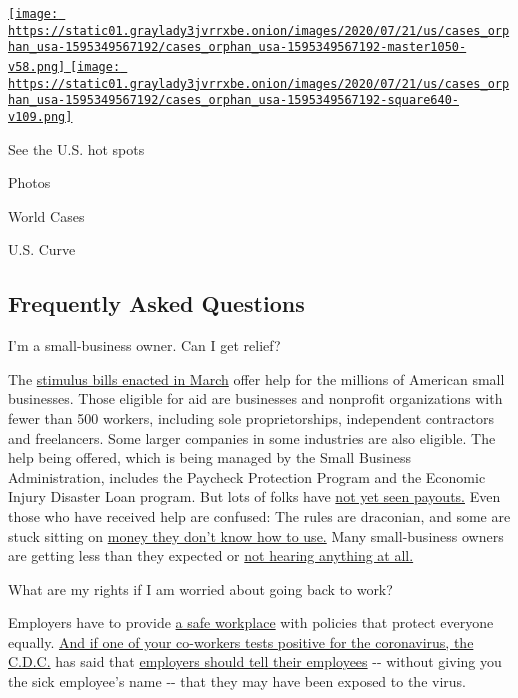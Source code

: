 \href{https://www.nytimes3xbfgragh.onion/interactive/2020/us/coronavirus-us-cases.html}{\texttt{[image: https://static01.graylady3jvrrxbe.onion/images/2020/07/21/us/cases\_orphan\_usa-1595349567192/cases\_orphan\_usa-1595349567192-master1050-v58.png]}
\texttt{[image: https://static01.graylady3jvrrxbe.onion/images/2020/07/21/us/cases\_orphan\_usa-1595349567192/cases\_orphan\_usa-1595349567192-square640-v109.png]}}

See the U.S. hot spots

Photos

World Cases

U.S. Curve

\hypertarget{frequently-asked-questions}{%
\subsection{Frequently Asked
Questions}\label{frequently-asked-questions}}

I'm a small-business owner. Can I get relief?

The
\href{https://www.nytimes3xbfgragh.onion/article/small-business-loans-stimulus-grants-freelancers-coronavirus.html}{stimulus
bills enacted in March} offer help for the millions of American small
businesses. Those eligible for aid are businesses and nonprofit
organizations with fewer than 500 workers, including sole
proprietorships, independent contractors and freelancers. Some larger
companies in some industries are also eligible. The help being offered,
which is being managed by the Small Business Administration, includes
the Paycheck Protection Program and the Economic Injury Disaster Loan
program. But lots of folks have
\href{https://www.nytimes3xbfgragh.onion/interactive/2020/05/07/business/small-business-loans-coronavirus.html}{not
yet seen payouts.} Even those who have received help are confused: The
rules are draconian, and some are stuck sitting on
\href{https://www.nytimes3xbfgragh.onion/2020/05/02/business/economy/loans-coronavirus-small-business.html}{money
they don't know how to use.} Many small-business owners are getting less
than they expected or
\href{https://www.nytimes3xbfgragh.onion/2020/06/10/business/Small-business-loans-ppp.html}{not
hearing anything at all.}

What are my rights if I am worried about going back to work?

Employers have to provide
\href{https://www.osha.gov/SLTC/covid-19/standards.html}{a safe
workplace} with policies that protect everyone equally.
\href{https://www.nytimes3xbfgragh.onion/article/coronavirus-money-unemployment.html}{And
if one of your co-workers tests positive for the coronavirus, the
C.D.C.} has said that
\href{https://www.cdc.gov/coronavirus/2019-ncov/community/guidance-business-response.html}{employers
should tell their employees} -\/- without giving you the sick employee's
name -\/- that they may have been exposed to the virus.

